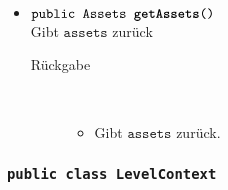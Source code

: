 \begin{description}
\begin{itemize}
		\item $\texttt{public Assets \textbf{getAssets}()}$ \\ Gibt $\texttt{assets}$ zurück
		\begin{description}
			\item[Rückgabe] \hfill \\
			\vspace{-.8cm}
			\begin{itemize}
				\item Gibt $\texttt{assets}$ zurück.
			\end{itemize}
			\end{description}

		\end{itemize}
	\end{description}
	
	
	
	

\subsubsection{\normalfont \texttt{public class \textbf{LevelContext}}}

